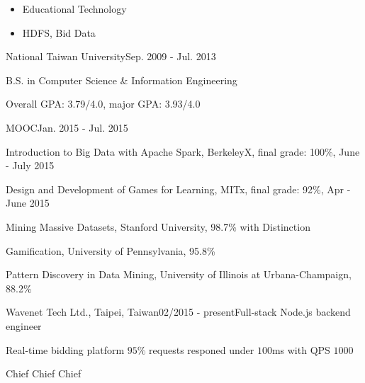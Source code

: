 \documentclass{joel_cv}
\begin{document}
\begin{cvHeader} 
\end{cvHeader}

%
%

\begin{itemize}
  \item Educational Technology
  \item HDFS, Bid Data
\end{itemize}

%
%

\begin{sectionContentSimple}{National Taiwan University}{Sep. 2009 - Jul. 2013}
  \item B.S. in Computer Science \& Information Engineering
  \item Overall GPA: 3.79/4.0, major GPA: 3.93/4.0
\end{sectionContentSimple}

\begin{sectionContentSimple}{MOOC}{Jan. 2015 - Jul. 2015}
  \item Introduction to Big Data with Apache Spark, BerkeleyX, final grade: 100\%, June - July 2015
  \item Design and Development of Games for Learning, MITx, final grade: 92\%, Apr - June 2015
  \item Mining Massive Datasets, Stanford University, 98.7\% with Distinction
  \item Gamification, University of Pennsylvania, 95.8\%
  \item Pattern Discovery in Data Mining, University of Illinois at Urbana-Champaign, 88.2\%
\end{sectionContentSimple}

%
%


\begin{sectionContentNormal}{Wavenet Tech Ltd., Taipei, Taiwan}{02/2015 - present}{Full-stack Node.js backend engineer}
  \item Real-time bidding platform $95\%$ requests responed under $100$ms with QPS $1000$
  \item Chief Chief Chief
\end{sectionContentNormal}
\end{document}
